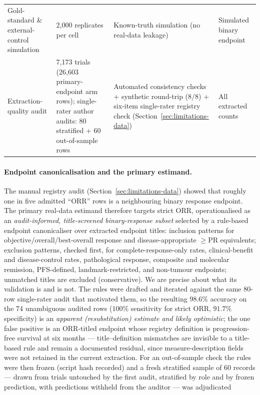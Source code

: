 \documentclass[11pt]{article}
\begin{document}
\begin{table}[htbp]
\begin{tabular}{p{}p{}p{}p{}}
Gold-standard \& external-control simulation & 2{,}000 replicates per cell & Known-truth simulation (no real-data leakage) & Simulated binary endpoint \\
Extraction-quality audit & 7{,}173 trials (26{,}603 primary-endpoint arm rows); single-rater author audits: 80 stratified + 60 out-of-sample rows & Automated consistency checks + synthetic round-trip ($8/8$) + six-item single-rater registry check (Section~\ref{sec:limitations-data}) & All extracted counts \\
\bottomrule
\end{tabular}
\end{table}

\paragraph{Endpoint canonicalisation and the primary estimand.}
\label{sec:data-endpoint}
The manual registry audit (Section~\ref{sec:limitations-data}) showed that
roughly one in five admitted ``ORR'' rows is a neighbouring binary response
endpoint. The primary real-data estimand therefore targets strict ORR,
operationalised as an \emph{audit-informed, title-screened binary-response subset}
selected by a rule-based endpoint canonicaliser over extracted endpoint
titles: inclusion patterns for objective/overall/best-overall response and
disease-appropriate $\ge$PR equivalents; exclusion patterns, checked first,
for complete-response-only rates, clinical-benefit and disease-control rates,
pathological response, composite and molecular remission, PFS-defined,
landmark-restricted, and non-tumour endpoints; unmatched titles are excluded
(conservative). We are precise about what its validation is and is not. The
rules were drafted and iterated against the same $80$-row single-rater audit
that motivated them, so the resulting $98.6\%$ accuracy on the $74$
unambiguous audited rows ($100\%$ sensitivity for strict ORR, $91.7\%$
specificity) is an \emph{apparent (resubstitution) estimate and likely
optimistic}; the one false positive is an ORR-titled endpoint whose registry
definition is progression-free survival at six months --- title--definition
mismatches are invisible to a title-based rule and remain a documented
residual, since measure-description fields were not retained in the current
extraction. For an out-of-sample check the rules were then frozen (script
hash recorded) and a fresh stratified sample of $60$ records --- drawn from
trials untouched by the first audit, stratified by role and by frozen
prediction, with predictions withheld from the auditor --- was adjudicated
\end{document}
